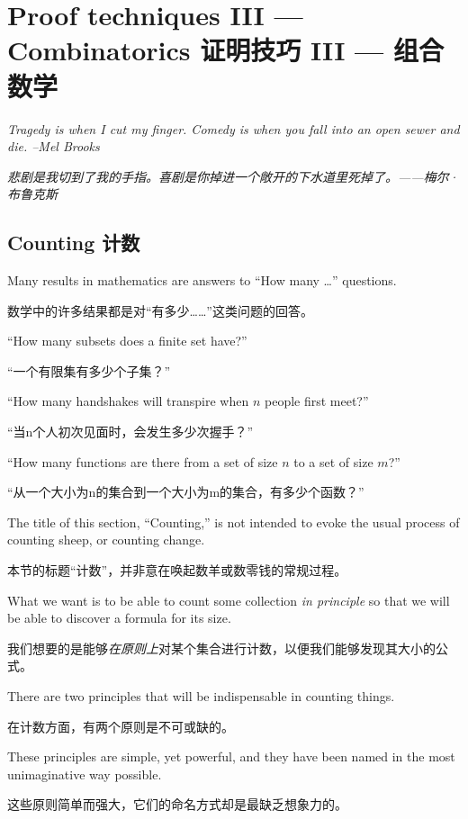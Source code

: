 \chapter{Proof techniques III --- Combinatorics 证明技巧 III --- 组合数学}
\label{ch:comb}

{\em Tragedy is when I cut my finger. Comedy is when you fall into an open sewer and die. --Mel Brooks }

{\em 悲剧是我切到了我的手指。喜剧是你掉进一个敞开的下水道里死掉了。——梅尔·布鲁克斯 }


\section{Counting 计数}
\label{sec:counting}

Many results in mathematics are answers to ``How many \ldots'' questions.

数学中的许多结果都是对“有多少……”这类问题的回答。

\noindent ``How many subsets does a finite set have?''

\noindent “一个有限集有多少个子集？”

\noindent ``How many handshakes will transpire when $n$ people first meet?''

\noindent “当n个人初次见面时，会发生多少次握手？”

\noindent ``How many functions are there from a set of size $n$ to a set of size $m$?''

\noindent “从一个大小为n的集合到一个大小为m的集合，有多少个函数？”

The title of this section, ``Counting,'' is not intended to evoke the usual
process of counting sheep, or counting change.

本节的标题“计数”，并非意在唤起数羊或数零钱的常规过程。

What we want is to be able
to count some collection \emph{in principle} so that we will be able to 
discover a formula for its size.

我们想要的是能够\emph{在原则上}对某个集合进行计数，以便我们能够发现其大小的公式。

There are two principles that will be indispensable in counting things.

在计数方面，有两个原则是不可或缺的。

These principles are simple, yet powerful, and they have been named in
the most unimaginative way possible.

这些原则简单而强大，它们的命名方式却是最缺乏想象力的。

